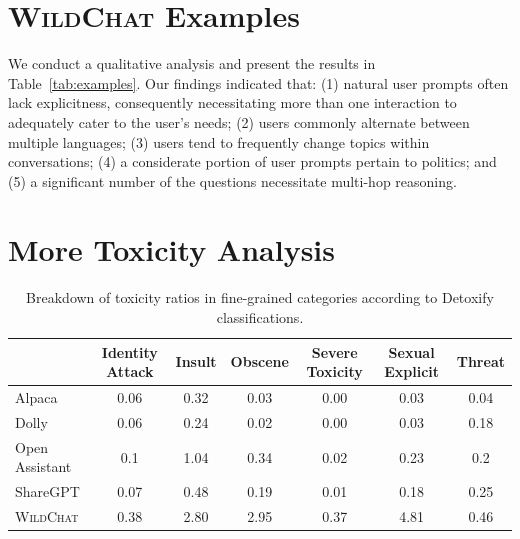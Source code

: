 \documentclass{article} %
\newcommand{\corpus}{\textsc{WildChat}\xspace}
\begin{document}
\section{\label{sec:examples}\corpus Examples}
We conduct a qualitative analysis and present the results in Table~\ref{tab:examples}. Our findings indicated that: (1) natural user prompts often lack explicitness, consequently necessitating more than one interaction to adequately cater to the user's needs; (2) users commonly alternate between multiple languages; (3) users tend to frequently change topics within conversations; (4) a considerate portion of user prompts pertain to politics; and (5) a significant number of the questions necessitate multi-hop reasoning.


\section{\label{sec:more_toxicity}More Toxicity Analysis}
\begin{table}[t]
\small
\centering
\begin{tabular}{lcccccc}
\toprule
                  & Identity Attack & Insult & Obscene & Severe Toxicity & Sexual Explicit & Threat \\ \midrule
Alpaca            & 0.06            & 0.32   & 0.03    & 0.00               & 0.03            & 0.04   \\
Dolly             & 0.06            & 0.24   & 0.02    & 0.00               & 0.03            & 0.18   \\
Open Assistant    & 0.1             & 1.04   & 0.34    & 0.02            & 0.23            & 0.2    \\
ShareGPT          & 0.07            & 0.48   & 0.19    & 0.01            & 0.18            & 0.25   \\
\corpus & 0.38            & 2.80    & 2.95    & 0.37            & 4.81            & 0.46  \\
\bottomrule
\end{tabular}
\caption{Breakdown of toxicity ratios in fine-grained categories according to Detoxify classifications.}
\label{tab:detoxify-categories}
\end{table}
\end{document}
